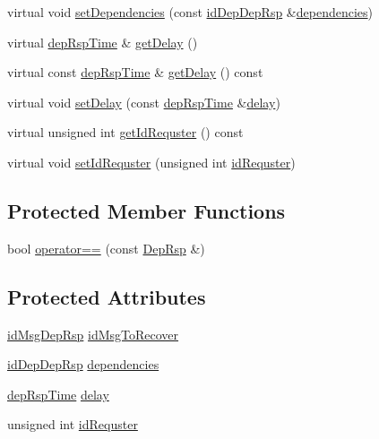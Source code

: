 \begin{DoxyCompactItemize}
\item 
virtual void \hyperlink{classDepRsp_ab144b3866dd1a527842806ced90495f6}{set\+Dependencies} (const \hyperlink{depRsp__m_8h_a3c2ceb107008eb344443aaab2eb872b8}{id\+Dep\+Dep\+Rsp} \&\hyperlink{classDepRsp_a0881ee52098e202a4486da80efa6ce1f}{dependencies})
\item 
virtual \hyperlink{depRsp__m_8h_ab118b8474723cf26f98151aae3d55940}{dep\+Rsp\+Time} \& \hyperlink{classDepRsp_a89f0b26c269083713702386392f82c45}{get\+Delay} ()
\item 
virtual const \hyperlink{depRsp__m_8h_ab118b8474723cf26f98151aae3d55940}{dep\+Rsp\+Time} \& \hyperlink{classDepRsp_a8badf32e7f81c0ec7a9b4eb22fb83c0a}{get\+Delay} () const
\item 
virtual void \hyperlink{classDepRsp_a582682e76c175afb882cf50d2b423501}{set\+Delay} (const \hyperlink{depRsp__m_8h_ab118b8474723cf26f98151aae3d55940}{dep\+Rsp\+Time} \&\hyperlink{classDepRsp_a9b383b175e0b581e1558b2dc34a21b7a}{delay})
\item 
virtual unsigned int \hyperlink{classDepRsp_a3c858b0cb735e9e6309e8bf25bf272dd}{get\+Id\+Requster} () const
\item 
virtual void \hyperlink{classDepRsp_a7029f3c6f0e1b230965a0143a3c9724e}{set\+Id\+Requster} (unsigned int \hyperlink{classDepRsp_ae8c6f097db47049e4cb84e6788f9d58d}{id\+Requster})
\end{DoxyCompactItemize}
\subsection*{Protected Member Functions}
\begin{DoxyCompactItemize}
\item 
bool \hyperlink{classDepRsp_a4796a7a035aa6f4b9deb40498731a941}{operator==} (const \hyperlink{classDepRsp}{Dep\+Rsp} \&)
\end{DoxyCompactItemize}
\subsection*{Protected Attributes}
\begin{DoxyCompactItemize}
\item 
\hyperlink{depRsp__m_8h_a8a41011e0821f196429cd4bc45638bcf}{id\+Msg\+Dep\+Rsp} \hyperlink{classDepRsp_a7b777428e859ba7a6f083e13f6431cf4}{id\+Msg\+To\+Recover}
\item 
\hyperlink{depRsp__m_8h_a3c2ceb107008eb344443aaab2eb872b8}{id\+Dep\+Dep\+Rsp} \hyperlink{classDepRsp_a0881ee52098e202a4486da80efa6ce1f}{dependencies}
\item 
\hyperlink{depRsp__m_8h_ab118b8474723cf26f98151aae3d55940}{dep\+Rsp\+Time} \hyperlink{classDepRsp_a9b383b175e0b581e1558b2dc34a21b7a}{delay}
\item 
unsigned int \hyperlink{classDepRsp_ae8c6f097db47049e4cb84e6788f9d58d}{id\+Requster}
\end{DoxyCompactItemize}
